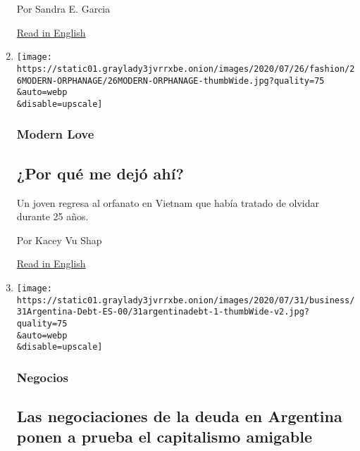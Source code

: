 \begin{enumerate}
  Por Sandra E. Garcia

  \href{https://www.nytimes3xbfgragh.onion/2020/08/01/obituaries/victor-victor-dead-coronavirus.html}{Read
  in English}
\item
  \href{/es/2020/08/02/espanol/estilos-de-vida/adopcion-orfanato.html}{}

  \texttt{[image: https://static01.graylady3jvrrxbe.onion/images/2020/07/26/fashion/26MODERN-ORPHANAGE/26MODERN-ORPHANAGE-thumbWide.jpg?quality=75\\\&auto=webp\\\&disable=upscale]}

  \hypertarget{modern-love}{%
  \subsubsection{Modern Love}\label{modern-love}}

  \hypertarget{por-quuxe9-me-dejuxf3-ahuxed}{%
  \subsection{¿Por qué me dejó
  ahí?}\label{por-quuxe9-me-dejuxf3-ahuxed}}

  Un joven regresa al orfanato en Vietnam que había tratado de olvidar
  durante 25 años.

  Por Kacey Vu Shap

  \href{https://www.nytimes3xbfgragh.onion/2020/07/24/style/modern-love-adoption-vietnam-why-did-she-leave-me-there.html}{Read
  in English}
\item
  \href{/es/2020/07/31/espanol/negocios/argentina-deuda.html}{}

  \texttt{[image: https://static01.graylady3jvrrxbe.onion/images/2020/07/31/business/31Argentina-Debt-ES-00/31argentinadebt-1-thumbWide-v2.jpg?quality=75\\\&auto=webp\\\&disable=upscale]}

  \hypertarget{negocios}{%
  \subsubsection{Negocios}\label{negocios}}

  \hypertarget{las-negociaciones-de-la-deuda-en-argentina-ponen-a-prueba-el-capitalismo-amigable}{%
  \subsection{Las negociaciones de la deuda en Argentina ponen a prueba
  el capitalismo
  amigable}\label{las-negociaciones-de-la-deuda-en-argentina-ponen-a-prueba-el-capitalismo-amigable}}


\end{enumerate}

